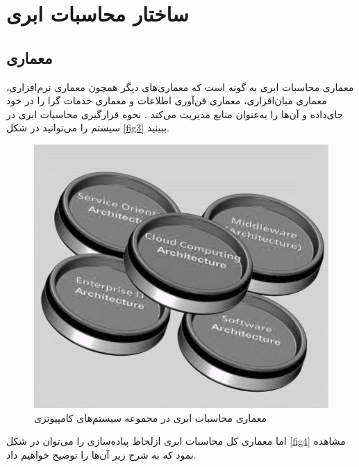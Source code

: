 \documentclass[a4paper,oneside,12pt]{report}
\begin{document}
\section{ساختار محاسبات ابری}
\subsection{معماری}
معماری محاسبات ابری به گونه است که معماری‌های دیگر همچون معماری نرم‌افزاری، معماری میان‌افزاری، معماری فن‌آوری اطلاعات و معماری خدمات گرا را در خود جای‌داده و آن‌ها را به‌عنوان منابع مدیریت می‌کند
\cite{12}. 
نحوه قرارگیری محاسبات ابری در سیستم را می‌توانید در شکل
\ref{fig3} 
ببینید.
\begin{figure}
\centering
\includegraphics[scale=0.45]{fi1}
\caption{معماری محاسبات ابری در مجموعه سیستم‌های کامپیوتری
\cite{9}}\label{fig1}
\end{figure}
اما معماری کل محاسبات ابری ازلحاظ پیاده‌سازی را می‌توان در شکل
\ref{fig4} 
مشاهده نمود که به شرح زیر آن‌ها را توضیح خواهیم داد.
\end{document}
